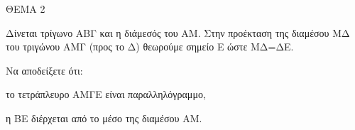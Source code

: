 
ΘΕΜΑ 2

Δίνεται τρίγωνο ΑΒΓ και η διάμεσός του ΑΜ. Στην προέκταση της διαμέσου ΜΔ του τριγώνου ΑΜΓ (προς το Δ) θεωρούμε σημείο Ε ώστε ΜΔ=ΔΕ.

Να αποδείξετε ότι:

\begin{alist}
\item το τετράπλευρο ΑΜΓΕ είναι παραλληλόγραμμο, 

\item η ΒΕ διέρχεται από το μέσο της διαμέσου ΑΜ. 
\end{alist}
